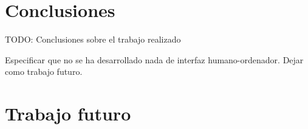 \chapter{Conclusiones\label{sec:conclusiones}}

TODO: Conclusiones sobre el trabajo realizado

Especificar que no se ha desarrollado nada de interfaz humano-ordenador. Dejar como trabajo futuro.

\chapter{Trabajo futuro\label{sec:trabajo futuro}}